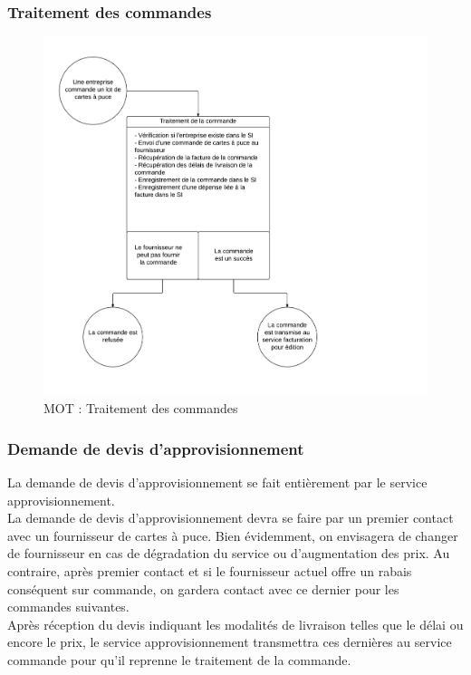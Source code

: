 \subsubsection{Traitement des commandes}
\begin{figure}[ht]
    \centering
    \includegraphics[width=\textwidth]{mot-traitement-commandes}
    \caption{MOT : Traitement des commandes}
    \label{fig:mot-traitement-commandes}
\end{figure}
\newpage

\subsubsection{Demande de devis d'approvisionnement}

La demande de devis d'approvisionnement se fait entièrement par le service
approvisionnement. \\

La demande de devis d'approvisionnement devra se faire par un premier
contact avec un fournisseur de cartes à puce. Bien évidemment, on
envisagera de changer de fournisseur en cas de dégradation du service ou
d'augmentation des prix. Au contraire, après premier contact et si le
fournisseur actuel offre un rabais conséquent sur commande, on gardera contact
avec ce dernier pour les commandes suivantes. \\

Après réception du devis indiquant les modalités de livraison telles que le
délai ou encore le prix, le service approvisionnement transmettra ces dernières
au service commande pour qu'il reprenne le traitement de la commande.

